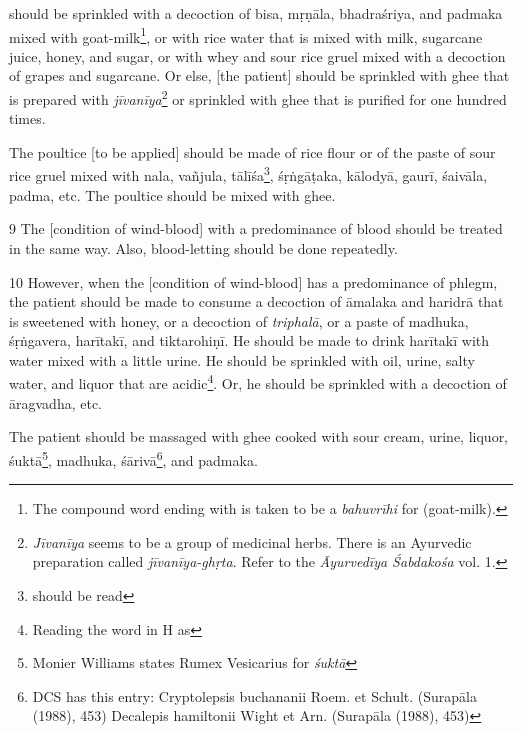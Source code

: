 \begin{translation}
     should be sprinkled with a decoction of \gls{bisa}, \gls{mṛṇāla}, \gls{bhadraśriya}, and \gls{padmaka} mixed with goat-milk\footnote{The compound word ending with  is taken to be a \textit{bahuvrīhi} for  (goat-milk).}, or with rice water that is mixed with milk, sugarcane juice, honey, and sugar, or with whey and sour rice gruel mixed with a decoction of grapes and sugarcane. Or else, [the patient] should be sprinkled with ghee that is prepared with \textit{jīvanīya}\footnote{\textit{Jīvanīya} seems to be a group of medicinal herbs. There is an Ayurvedic preparation called \textit{jīvanīya-ghṛta}. Refer to the \textit{Āyurvedīya Śabdakośa} vol. 1.} or sprinkled with ghee that is purified for one hundred times.

    The poultice [to be applied] should be made of rice flour or of the paste of sour rice gruel mixed with \gls{nala}, \gls{vañjula}, \gls{tālīśa}\footnote{ should be read }, \gls{śṛṅgāṭaka}, \gls{kālodyā}, \gls{gaurī}, \gls{śaivāla}, \gls{padma}, etc. The poultice should be mixed with ghee.

    \item[9]
     The [condition of wind-blood] with a predominance of blood should be treated in the same way. Also, blood-letting should be done repeatedly.

     \item[10]
    However, when the [condition of wind-blood] has a predominance of phlegm, the patient should be made to consume a decoction of \gls{āmalaka} and \gls{haridrā} that is sweetened with honey, or a decoction of \textit{triphalā}, or a paste of \gls{madhuka}, \gls{śṛṅgavera}, \gls{harītakī}, and \gls{tiktarohiṇī}. He should be made to drink \gls{harītakī} with water mixed with a little urine. He should be sprinkled with oil, urine, salty water, and liquor that are acidic\footnote{Reading the word  in H as }. Or, he should be sprinkled with a decoction of \gls{āragvadha}, etc. 

    The patient should be massaged with ghee cooked with sour cream, urine, liquor, \gls{śuktā}\footnote{Monier Williams states Rumex Vesicarius for \textit{śuktā}}, \gls{madhuka}, \gls{śārivā}\footnote{DCS has this entry: Cryptolepsis buchananii Roem. et Schult. (Surapāla (1988), 453) Decalepis hamiltonii Wight et Arn. (Surapāla (1988), 453)}, and \gls{padmaka}.
    

\end{translation}
